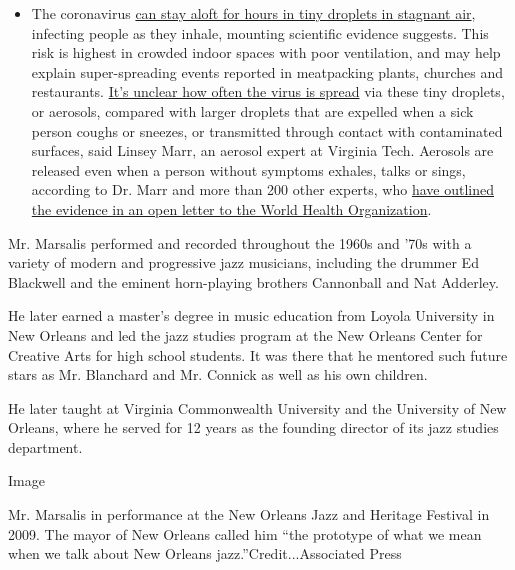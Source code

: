 \begin{itemize}
  \begin{itemize}
  \tightlist
  \item
    The coronavirus
    \href{https://www.nytimes.com/2020/07/04/health/239-experts-with-one-big-claim-the-coronavirus-is-airborne.html?action=click\&pgtype=Article\&state=default\&region=MAIN_CONTENT_3\&context=storylines_faq}{can
    stay aloft for hours in tiny droplets in stagnant air}, infecting
    people as they inhale, mounting scientific evidence suggests. This
    risk is highest in crowded indoor spaces with poor ventilation, and
    may help explain super-spreading events reported in meatpacking
    plants, churches and restaurants.
    \href{https://www.nytimes.com/2020/07/06/health/coronavirus-airborne-aerosols.html?action=click\&pgtype=Article\&state=default\&region=MAIN_CONTENT_3\&context=storylines_faq}{It's
    unclear how often the virus is spread} via these tiny droplets, or
    aerosols, compared with larger droplets that are expelled when a
    sick person coughs or sneezes, or transmitted through contact with
    contaminated surfaces, said Linsey Marr, an aerosol expert at
    Virginia Tech. Aerosols are released even when a person without
    symptoms exhales, talks or sings, according to Dr. Marr and more
    than 200 other experts, who
    \href{https://academic.oup.com/cid/article/doi/10.1093/cid/ciaa939/5867798}{have
    outlined the evidence in an open letter to the World Health
    Organization}.
  \end{itemize}
\end{itemize}

Mr. Marsalis performed and recorded throughout the 1960s and '70s with a
variety of modern and progressive jazz musicians, including the drummer
Ed Blackwell and the eminent horn-playing brothers Cannonball and Nat
Adderley.

He later earned a master's degree in music education from Loyola
University in New Orleans and led the jazz studies program at the New
Orleans Center for Creative Arts for high school students. It was there
that he mentored such future stars as Mr. Blanchard and Mr. Connick as
well as his own children.

He later taught at Virginia Commonwealth University and the University
of New Orleans, where he served for 12 years as the founding director of
its jazz studies department.

Image

Mr. Marsalis in performance at the New Orleans Jazz and Heritage
Festival in 2009. The mayor of New Orleans called him ``the prototype of
what we mean when we talk about New Orleans jazz.''Credit...Associated
Press

